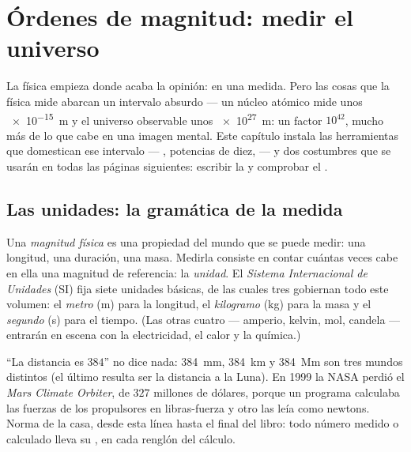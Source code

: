 \chapter{Órdenes de magnitud: medir el universo}\label{ch:g10:orders-of-magnitude}

La física empieza donde acaba la opinión: en una medida. Pero las cosas
que la física mide abarcan un intervalo absurdo --- un núcleo atómico
mide unos \qty{e-15}{m} y el universo observable unos \qty{e27}{m}: un
factor $10^{42}$, mucho más de lo que cabe en una imagen mental. Este
capítulo instala las herramientas que domestican ese intervalo ---
, potencias de diez,  --- y dos costumbres
que se usarán en todas las páginas siguientes: escribir la  y
comprobar el .

\section{Las unidades: la gramática de la medida}

\begin{definition}\label{def:g10:orders-of-magnitude:unit}
Una \emph{magnitud física} es una propiedad del
mundo que se puede medir: una longitud, una duración, una masa. Medirla
consiste en contar cuántas veces cabe en ella una magnitud de
referencia: la \emph{unidad}. El \emph{Sistema
Internacional de Unidades} (SI) fija siete unidades básicas, de las cuales tres gobiernan
todo este volumen: el \emph{metro} (\unit{m}) para la
longitud, el \emph{kilogramo} (\unit{kg}) para la masa
y el \emph{segundo} (\unit{s}) para el tiempo. (Las otras
cuatro --- amperio, kelvin, mol, candela --- entrarán en escena con la
electricidad, el calor y la química.)
\end{definition}

\begin{remark}\label{rem:g10:orders-of-magnitude:units}
``La distancia es $384$'' no dice nada: \qty{384}{mm},
\qty{384}{km} y \qty{384}{Mm} son tres mundos distintos (el último
resulta ser la distancia a la Luna). En 1999 la NASA perdió el
\emph{Mars Climate Orbiter}, de $327$ millones de dólares, porque un
programa calculaba las fuerzas de los propulsores en libras-fuerza y
otro las leía como newtons. Norma de la casa, desde esta línea hasta el
final del libro: todo número medido o calculado lleva su , en cada
renglón del cálculo.
\end{remark}

